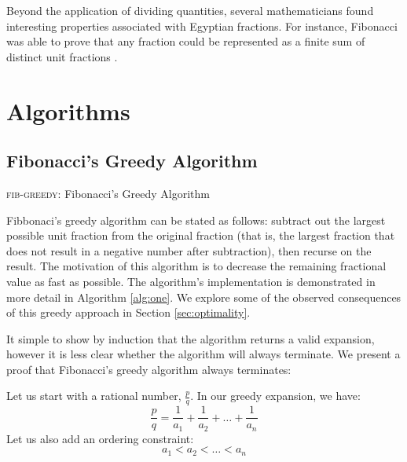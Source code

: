 \documentclass[paper=a4, fontsize=11pt]{scrartcl}
\numberwithin{equation}{section}	 %
\numberwithin{figure}{section}	 %
\numberwithin{table}{section}	 %
\begin{document}
Beyond the application of dividing quantities, several mathematicians found interesting properties associated with Egyptian fractions. For instance, Fibonacci was able to prove that any fraction could be represented as a finite sum of distinct unit fractions \cite{dunton}.

\section{Algorithms}
\subsection{Fibonacci's Greedy Algorithm}
\begin{algorithm}[t]

\caption{\textsc{fib-greedy}: Fibonacci's Greedy Algorithm}
\label{alg:one}
\end{algorithm}
Fibbonaci's greedy algorithm can be stated as follows: subtract out the largest possible unit fraction from the original fraction (that is, the largest fraction that does not result in a negative number after subtraction), then recurse on the result. The motivation of this algorithm is to decrease the remaining fractional value as fast as possible. The algorithm's implementation is demonstrated in more detail in Algorithm \ref{alg:one}. We explore some of the observed consequences of this greedy approach in Section \ref{sec:optimality}.

It simple to show by induction that the algorithm returns a valid expansion, however it is less clear whether the algorithm will always terminate. We present a proof that Fibonacci’s greedy algorithm always terminates:

Let us start with a rational number, $\frac{p}{q}$. In our greedy expansion, we have:
\begin{equation}\label{greedy1}
	\frac{p}{q} = \frac{1}{a_1} + \frac{1}{a_2} + \ldots + \frac{1}{a_n}
\end{equation}
Let us also add an ordering constraint:
\begin{equation}
	a_1 < a_2 < \ldots < a_n
\end{equation}
\end{document}

